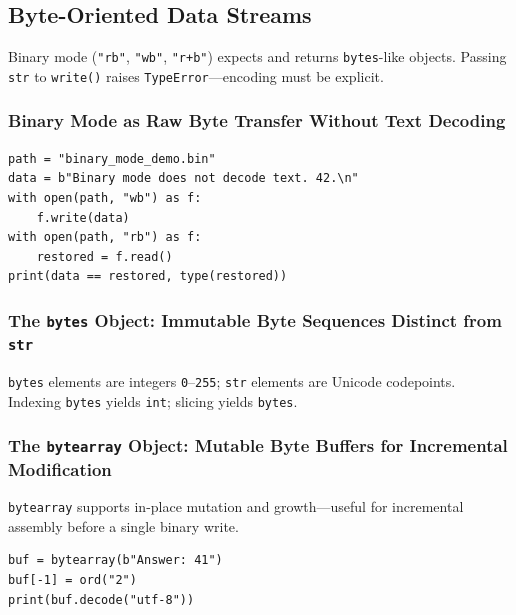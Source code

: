 \subsection{Byte-Oriented Data Streams}

Binary mode (\texttt{"rb"}, \texttt{"wb"}, \texttt{"r+b"}) expects and returns \texttt{bytes}-like objects. Passing \texttt{str} to \texttt{write()} raises \texttt{TypeError}---encoding must be explicit.

\subsubsection{Binary Mode as Raw Byte Transfer Without Text Decoding}

\begin{verbatim}
path = "binary_mode_demo.bin"
data = b"Binary mode does not decode text. 42.\n"
with open(path, "wb") as f:
    f.write(data)
with open(path, "rb") as f:
    restored = f.read()
print(data == restored, type(restored))
\end{verbatim}

\subsubsection{The \texttt{bytes} Object: Immutable Byte Sequences Distinct from \texttt{str}}

\texttt{bytes} elements are integers \texttt{0}--\texttt{255}; \texttt{str} elements are Unicode codepoints. Indexing \texttt{bytes} yields \texttt{int}; slicing yields \texttt{bytes}.

\subsubsection{The \texttt{bytearray} Object: Mutable Byte Buffers for Incremental Modification}

\texttt{bytearray} supports in-place mutation and growth---useful for incremental assembly before a single binary write.

\begin{verbatim}
buf = bytearray(b"Answer: 41")
buf[-1] = ord("2")
print(buf.decode("utf-8"))
\end{verbatim}
